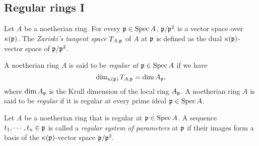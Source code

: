 
    
\subsection{Regular rings I}



    \begin{definition}\label{def: Zariski's tangent space}
        Let \(A\) be a noetherian ring.
        For every ${\mathfrak{p}} \in \operatorname{Spec} A$, \({\mathfrak{p}}/{\mathfrak{p}}^2\) is a vector space over \({\kappa}({\mathfrak{p}})\).
        The \emph{Zariski's tangent space} $T_{A,{\mathfrak{p}}}$ of \(A\) at \({\mathfrak{p}}\) is defined as the dual \({\kappa}({\mathfrak{p}})\)-vector space of \({\mathfrak{p}}/{\mathfrak{p}}^2\).
    \end{definition}

    \begin{definition}\label{def: regular ring}
        A noetherian ring \(A\) is said to be \emph{regular at \({\mathfrak{p}} \in \operatorname{Spec} A\)} if we have 
        \[ \dim_{{\kappa}({\mathfrak{p}})} T_{A,{\mathfrak{p}}} = \dim A_{\mathfrak{p}}, \]
        where \(\dim A_{\mathfrak{p}}\) is the Krull dimension of the local ring \(A_{\mathfrak{p}}\).
        A noetherian ring \(A\) is said to be \emph{regular} if it is regular at every prime ideal \({\mathfrak{p}} \in \operatorname{Spec} A\).
    \end{definition}

    \begin{definition}\label{def: regular system of parameters}
        Let \(A\) be a noetherian ring that is regular at \({\mathfrak{p}} \in \operatorname{Spec} A\).
        A sequence \(t_1,\cdots,t_n \in {\mathfrak{p}}\) is called a \emph{regular system of parameters} at \({\mathfrak{p}}\) if their images form a basis of the \({\kappa}({\mathfrak{p}})\)-vector space \({\mathfrak{p}}/{\mathfrak{p}}^2\).
    \end{definition}

